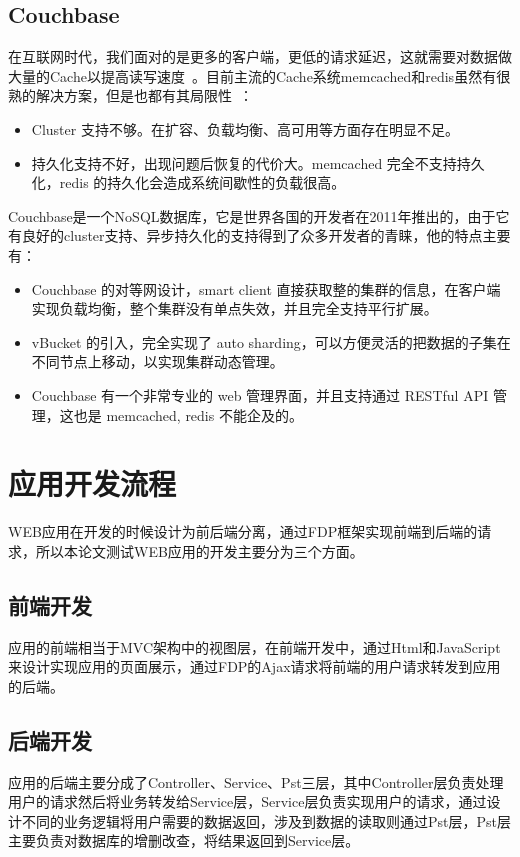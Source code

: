 \subsection{Couchbase}
在互联网时代，我们面对的是更多的客户端，更低的请求延迟，这就需要对数据做大量的Cache以提高读写速度~\cite{brown2012getting}。目前主流的Cache系统memcached和redis虽然有很熟的解决方案，但是也都有其局限性~\cite{kovacs2013cassandra}：
\begin{itemize}
\item Cluster 支持不够。在扩容、负载均衡、高可用等方面存在明显不足。
\item 持久化支持不好，出现问题后恢复的代价大。memcached 完全不支持持久化，redis 的持久化会造成系统间歇性的负载很高。
\end{itemize}
Couchbase是一个NoSQL数据库，它是世界各国的开发者在2011年推出的，由于它有良好的cluster支持、异步持久化的支持得到了众多开发者的青睐，他的特点主要有：
\begin{itemize}
\item Couchbase 的对等网设计，smart client 直接获取整的集群的信息，在客户端实现负载均衡，整个集群没有单点失效，并且完全支持平行扩展。
\item vBucket 的引入，完全实现了 auto sharding，可以方便灵活的把数据的子集在不同节点上移动，以实现集群动态管理。
\item Couchbase 有一个非常专业的 web 管理界面，并且支持通过 RESTful API 管理，这也是 memcached, redis 不能企及的。
\end{itemize}
\section{应用开发流程}
WEB应用在开发的时候设计为前后端分离，通过FDP框架实现前端到后端的请求，所以本论文测试WEB应用的开发主要分为三个方面。
\subsection{前端开发}
应用的前端相当于MVC架构中的视图层，在前端开发中，通过Html和JavaScript来设计实现应用的页面展示，通过FDP的Ajax请求将前端的用户请求转发到应用的后端。
\subsection{后端开发}
应用的后端主要分成了Controller、Service、Pst三层，其中Controller层负责处理用户的请求然后将业务转发给Service层，Service层负责实现用户的请求，通过设计不同的业务逻辑将用户需要的数据返回，涉及到数据的读取则通过Pst层，Pst层主要负责对数据库的增删改查，将结果返回到Service层。
